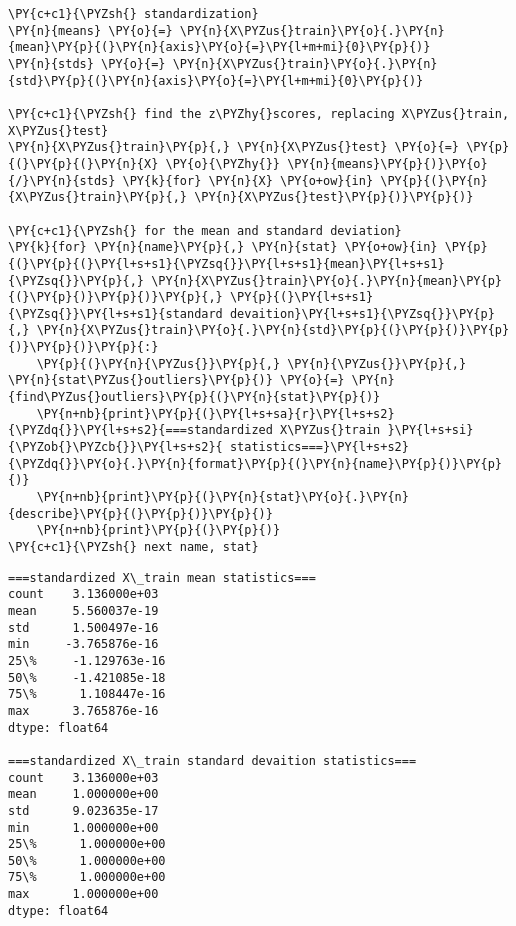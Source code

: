     \begin{tcolorbox}[breakable, size=fbox, boxrule=1pt, pad at break*=1mm,colback=cellbackground, colframe=cellborder]
\begin{Verbatim}[commandchars=\\\{\}]
\PY{c+c1}{\PYZsh{} standardization}
\PY{n}{means} \PY{o}{=} \PY{n}{X\PYZus{}train}\PY{o}{.}\PY{n}{mean}\PY{p}{(}\PY{n}{axis}\PY{o}{=}\PY{l+m+mi}{0}\PY{p}{)}
\PY{n}{stds} \PY{o}{=} \PY{n}{X\PYZus{}train}\PY{o}{.}\PY{n}{std}\PY{p}{(}\PY{n}{axis}\PY{o}{=}\PY{l+m+mi}{0}\PY{p}{)}

\PY{c+c1}{\PYZsh{} find the z\PYZhy{}scores, replacing X\PYZus{}train, X\PYZus{}test}
\PY{n}{X\PYZus{}train}\PY{p}{,} \PY{n}{X\PYZus{}test} \PY{o}{=} \PY{p}{(}\PY{p}{(}\PY{n}{X} \PY{o}{\PYZhy{}} \PY{n}{means}\PY{p}{)}\PY{o}{/}\PY{n}{stds} \PY{k}{for} \PY{n}{X} \PY{o+ow}{in} \PY{p}{(}\PY{n}{X\PYZus{}train}\PY{p}{,} \PY{n}{X\PYZus{}test}\PY{p}{)}\PY{p}{)}

\PY{c+c1}{\PYZsh{} for the mean and standard deviation}
\PY{k}{for} \PY{n}{name}\PY{p}{,} \PY{n}{stat} \PY{o+ow}{in} \PY{p}{(}\PY{p}{(}\PY{l+s+s1}{\PYZsq{}}\PY{l+s+s1}{mean}\PY{l+s+s1}{\PYZsq{}}\PY{p}{,} \PY{n}{X\PYZus{}train}\PY{o}{.}\PY{n}{mean}\PY{p}{(}\PY{p}{)}\PY{p}{)}\PY{p}{,} \PY{p}{(}\PY{l+s+s1}{\PYZsq{}}\PY{l+s+s1}{standard devaition}\PY{l+s+s1}{\PYZsq{}}\PY{p}{,} \PY{n}{X\PYZus{}train}\PY{o}{.}\PY{n}{std}\PY{p}{(}\PY{p}{)}\PY{p}{)}\PY{p}{)}\PY{p}{:}
    \PY{p}{(}\PY{n}{\PYZus{}}\PY{p}{,} \PY{n}{\PYZus{}}\PY{p}{,} \PY{n}{stat\PYZus{}outliers}\PY{p}{)} \PY{o}{=} \PY{n}{find\PYZus{}outliers}\PY{p}{(}\PY{n}{stat}\PY{p}{)}
    \PY{n+nb}{print}\PY{p}{(}\PY{l+s+sa}{r}\PY{l+s+s2}{\PYZdq{}}\PY{l+s+s2}{===standardized X\PYZus{}train }\PY{l+s+si}{\PYZob{}\PYZcb{}}\PY{l+s+s2}{ statistics===}\PY{l+s+s2}{\PYZdq{}}\PY{o}{.}\PY{n}{format}\PY{p}{(}\PY{n}{name}\PY{p}{)}\PY{p}{)}
    \PY{n+nb}{print}\PY{p}{(}\PY{n}{stat}\PY{o}{.}\PY{n}{describe}\PY{p}{(}\PY{p}{)}\PY{p}{)}
    \PY{n+nb}{print}\PY{p}{(}\PY{p}{)}
\PY{c+c1}{\PYZsh{} next name, stat}
\end{Verbatim}
\end{tcolorbox}

    \begin{Verbatim}[commandchars=\\\{\}]
===standardized X\_train mean statistics===
count    3.136000e+03
mean     5.560037e-19
std      1.500497e-16
min     -3.765876e-16
25\%     -1.129763e-16
50\%     -1.421085e-18
75\%      1.108447e-16
max      3.765876e-16
dtype: float64

===standardized X\_train standard devaition statistics===
count    3.136000e+03
mean     1.000000e+00
std      9.023635e-17
min      1.000000e+00
25\%      1.000000e+00
50\%      1.000000e+00
75\%      1.000000e+00
max      1.000000e+00
dtype: float64

    \end{Verbatim}

